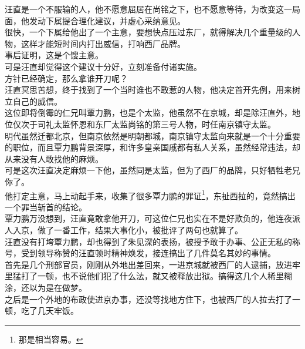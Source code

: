 \begin{multicols}{\theparacolNo}
汪直是一个不服输的人，他不愿意屈居在尚铭之下，也不愿意等待，为改变这一局面，他发动下属提合理化建议，并虚心采纳意见。\\

很快，一个下属给他出了一个主意，要想快点压过东厂，就得解决几个重量级的人物，这样才能短时间内打出威信，打响西厂品牌。\\

事后证明，这是个馊主意。\\

可是汪直却觉得这个建议十分好，立刻准备付诸实施。\\

方针已经确定，那么拿谁开刀呢？\\

汪直冥思苦想，终于找到了一个当时谁也不敢惹的人物，他决定首开先例，用来树立自己的威信。\\

这位即将倒霉的仁兄叫覃力鹏，也是个太监，他虽然不在京城，却是除汪直外，地位仅次于司礼太监怀恩和东厂太监尚铭的第三号人物，时任南京镇守太监。\\

明代虽然迁都北京，但南京依然是明朝都城，南京镇守太监向来就是一个十分重要的职位，而且覃力鹏背景深厚，和许多皇亲国戚都有私人关系，虽然经常违法，却从来没有人敢找他的麻烦。\\

可是这次汪直决定麻烦一下他，虽然同是太监，但为了西厂的品牌，只好牺牲老兄你了。\\

他打定主意，马上动起手来，收集了很多覃力鹏的罪证\footnote{那是相当容易。}，东扯西拉的，竟然搞出一个罪当斩首的结论。\\

覃力鹏万没想到，汪直竟敢拿他开刀，可这位仁兄也实在不是好欺负的，他连夜派人入京，做了一番工作，结果大事化小，被批评了两句也就算了。\\

汪直没有打垮覃力鹏，却也得到了朱见深的表扬，被授予敢于办事、公正无私的称号，受到领导称赞的汪直顿时精神焕发，接连搞出了几件莫名其妙的事情。\\

首先是几个刑部官员，刚刚从外地出差回来，一进京城就被西厂的人逮捕，放进牢里猛打了一顿，也不说他们犯了什么法，就又被释放出狱。搞得这几个人稀里糊涂，还以为是在做梦。\\

之后是一个外地的布政使进京办事，还没等找地方住下，也被西厂的人拉去打了一顿，吃了几天牢饭。\\


\end{multicols}
